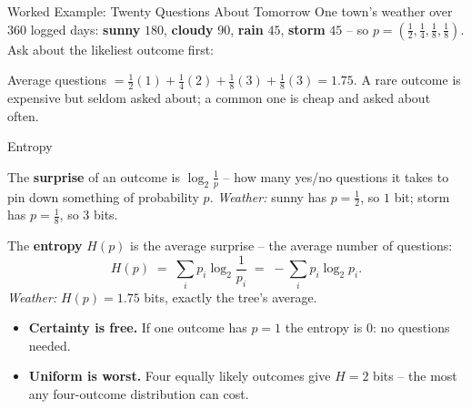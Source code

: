 \begin{frame}{Worked Example: Twenty Questions About Tomorrow}
\small
One town's weather over $360$ logged days: \textbf{sunny} $180$, \textbf{cloudy} $90$, \textbf{rain} $45$, \textbf{storm} $45$ -- so $p = (\tfrac12, \tfrac14, \tfrac18, \tfrac18)$. Ask about the likeliest outcome first:

\vspace{0.2em}
\centering
{}

\vspace{0.2em}
\raggedright
Average questions $= \tfrac12(1) + \tfrac14(2) + \tfrac18(3) + \tfrac18(3) = \mathbf{1.75}$. A rare outcome is expensive but seldom asked about; a common one is cheap and asked about often.
\end{frame}

\begin{frame}{Entropy}
\begin{rldefinition}
The \textbf{surprise} of an outcome is $\log_2 \tfrac{1}{p}$ -- how many yes/no questions it takes to pin down something of probability $p$. \emph{Weather:} sunny has $p = \tfrac12$, so $1$ bit; storm has $p = \tfrac18$, so $3$ bits.

\smallskip
The \textbf{entropy} $H(p)$ is the average surprise -- the average number of questions:
\[
H(p) \;=\; \sum_i p_i \log_2 \frac{1}{p_i} \;=\; -\sum_i p_i \log_2 p_i .
\]
\emph{Weather:} $H(p) = 1.75$ bits, exactly the tree's average.
\end{rldefinition}
\pause
\begin{itemize}
  \item \textbf{Certainty is free.} If one outcome has $p = 1$ the entropy is $0$: no questions needed.
  \item \textbf{Uniform is worst.} Four equally likely outcomes give $H = 2$ bits -- the most any four-outcome distribution can cost.
\end{itemize}
\end{frame}

